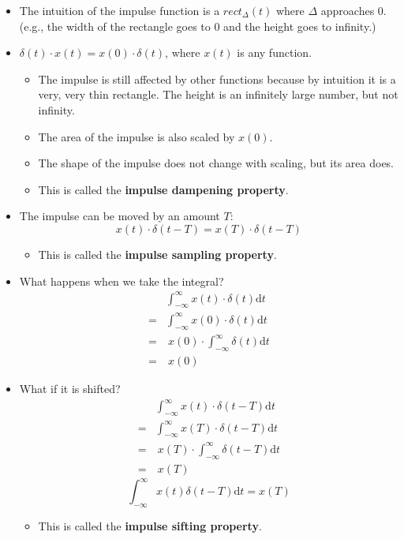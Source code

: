 \documentclass[10pt]{article}
\begin{document}
\begin{itemize}
    \item The intuition of the impulse function is a $rect_{\Delta}(t)$ where $\Delta$ approaches 0.  (e.g., the width of the rectangle goes to 0 and the height goes to infinity.)
    \item $\delta(t) \cdot x(t) = x(0) \cdot \delta(t)$, where $x(t)$ is any function.
    \begin{itemize}
        \item The impulse is still affected by other functions because by intuition it is a very, very thin rectangle.  The height is an infinitely large number, but not infinity.
        \item The area of the impulse is also scaled by $x(0)$.
        \item The shape of the impulse does not change with scaling, but its area does.
        \item This is called the \textbf{impulse dampening property}.
    \end{itemize}
    \item The impulse can be moved by an amount $T$:
    \[x(t) \cdot \delta(t - T) = x(T) \cdot \delta(t - T)\]
    \begin{itemize}
        \item This is called the \textbf{impulse sampling property}.
    \end{itemize}
    \item What happens when we take the integral?
    \begin{align*}
        &\int_{-\infty}^\infty x(t) \cdot \delta(t) \text{d}t\\
        = &\int_{-\infty}^\infty x(0) \cdot \delta(t) \text{d}t\\
        = &\:x(0) \cdot \int_{-\infty}^\infty \delta(t) \text{d}t\\
        = &\:x(0)
    \end{align*}
    \item What if it is shifted?
    \begin{align*}
        &\int_{-\infty}^\infty x(t) \cdot \delta(t - T) \text{d}t\\
        = &\int_{-\infty}^\infty x(T) \cdot \delta(t - T) \text{d}t\\
        = &\:x(T) \cdot \int_{-\infty}^\infty \delta(t - T) \text{d}t\\
        = &\:x(T)
    \end{align*}
    \[\boxed{\int_{-\infty}^\infty x(t) \delta(t - T) \text{d}t = x(T)}\]
    \begin{itemize}
        \item This is called the \textbf{impulse sifting property}.
    \end{itemize}
\end{itemize}
\end{document}
